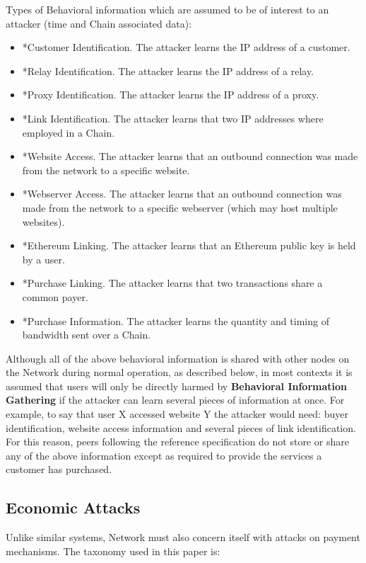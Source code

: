 Types of Behavioral information which are assumed to be of interest to an attacker (time and Chain associated data):

\begin{itemize}
\item *Customer Identification. The attacker learns the IP address of a customer.
\item *Relay Identification. The attacker learns the IP address of a relay.
\item *Proxy Identification. The attacker learns the IP address of a proxy.
\item *Link Identification. The attacker learns that two IP addresses where employed in a Chain.
\item *Website Access. The attacker learns that an outbound connection was made from the \Orchid{} network to a specific website.
\item *Webserver Access. The attacker learns that an outbound connection was made from the \Orchid{} network to a specific webserver (which may host multiple websites).
\item *Ethereum Linking. The attacker learns that an Ethereum public key is held by a \Orchid{} user.
\item *Purchase Linking. The attacker learns that two transactions share a common payer.
\item *Purchase Information. The attacker learns the quantity and timing of bandwidth sent over a Chain.
\end{itemize}

Although all of the above behavioral information is shared with other nodes on the \Orchid{} Network during normal operation, as described below, in most contexts it is assumed that users will only be directly harmed by \textbf{Behavioral Information Gathering} if the attacker can learn several pieces of information at once. For example, to say that user X accessed website Y the attacker would need: buyer identification, website access information and several pieces of link identification. For this reason, peers following the reference specification do not store or share any of the above information except as required to provide the services a customer has purchased.

\subsection{Economic Attacks}
\label{econ-attacks}

Unlike similar systems, \Orchid{} Network must also concern itself with attacks on payment mechanisms. The taxonomy used in this paper is:


